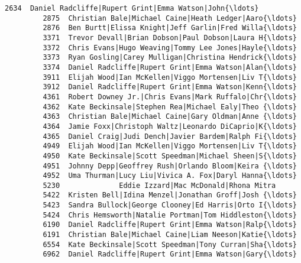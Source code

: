 \documentclass[11pt]{article}
\begin{document}
\begin{Verbatim}[commandchars=\\\{\}]
         2634  Daniel Radcliffe|Rupert Grint|Emma Watson|John{\ldots}   
         2875  Christian Bale|Michael Caine|Heath Ledger|Aaro{\ldots}   
         2876  Ben Burtt|Elissa Knight|Jeff Garlin|Fred Willa{\ldots}   
         3371  Trevor Devall|Brian Dobson|Paul Dobson|Laura H{\ldots}   
         3372  Chris Evans|Hugo Weaving|Tommy Lee Jones|Hayle{\ldots}   
         3373  Ryan Gosling|Carey Mulligan|Christina Hendrick{\ldots}   
         3374  Daniel Radcliffe|Rupert Grint|Emma Watson|Alan{\ldots}   
         3911  Elijah Wood|Ian McKellen|Viggo Mortensen|Liv T{\ldots}   
         3912  Daniel Radcliffe|Rupert Grint|Emma Watson|Kenn{\ldots}   
         4361  Robert Downey Jr.|Chris Evans|Mark Ruffalo|Chr{\ldots}   
         4362  Kate Beckinsale|Stephen Rea|Michael Ealy|Theo {\ldots}   
         4363  Christian Bale|Michael Caine|Gary Oldman|Anne {\ldots}   
         4364  Jamie Foxx|Christoph Waltz|Leonardo DiCaprio|K{\ldots}   
         4365  Daniel Craig|Judi Dench|Javier Bardem|Ralph Fi{\ldots}   
         4949  Elijah Wood|Ian McKellen|Viggo Mortensen|Liv T{\ldots}   
         4950  Kate Beckinsale|Scott Speedman|Michael Sheen|S{\ldots}   
         4951  Johnny Depp|Geoffrey Rush|Orlando Bloom|Keira {\ldots}   
         4952  Uma Thurman|Lucy Liu|Vivica A. Fox|Daryl Hanna{\ldots}   
         5230              Eddie Izzard|Mac McDonald|Rhona Mitra   
         5422  Kristen Bell|Idina Menzel|Jonathan Groff|Josh {\ldots}   
         5423  Sandra Bullock|George Clooney|Ed Harris|Orto I{\ldots}   
         5424  Chris Hemsworth|Natalie Portman|Tom Hiddleston{\ldots}   
         6190  Daniel Radcliffe|Rupert Grint|Emma Watson|Ralp{\ldots}   
         6191  Christian Bale|Michael Caine|Liam Neeson|Katie{\ldots}   
         6554  Kate Beckinsale|Scott Speedman|Tony Curran|Sha{\ldots}   
         6962  Daniel Radcliffe|Rupert Grint|Emma Watson|Gary{\ldots}   
         

\end{Verbatim}
\end{document}
